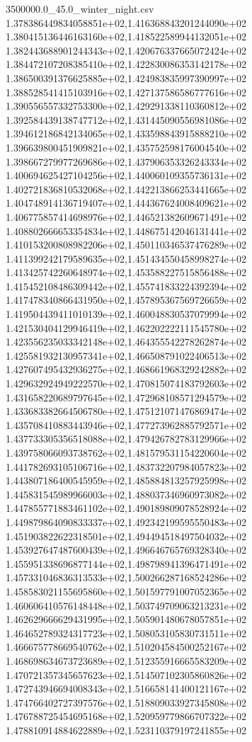 \begin{filecontents*}{3500000.0_45.0_winter_night.csv}
1.378386449834058851e+02,1.416368843201244090e+02
1.380415136446163160e+02,1.418522589944132051e+02
1.382443688901244343e+02,1.420676337665072424e+02
1.384472107208385410e+02,1.422830086353142178e+02
1.386500391376625885e+02,1.424983835997390997e+02
1.388528541415103916e+02,1.427137586586777616e+02
1.390556557332753300e+02,1.429291338110360812e+02
1.392584439138747712e+02,1.431445090556981086e+02
1.394612186842134065e+02,1.433598843915888210e+02
1.396639800451909821e+02,1.435752598176004540e+02
1.398667279977269686e+02,1.437906353326243334e+02
1.400694625427104256e+02,1.440060109355736131e+02
1.402721836810532068e+02,1.442213866253441665e+02
1.404748914136719407e+02,1.444367624008409621e+02
1.406775857414698976e+02,1.446521382609671491e+02
1.408802666653354834e+02,1.448675142046131441e+02
1.410153200808982206e+02,1.450110346537476289e+02
1.411399242179589635e+02,1.451434550458998274e+02
1.413425742260648974e+02,1.453588227515856488e+02
1.415452108486309442e+02,1.455741833224392394e+02
1.417478340866431950e+02,1.457895367569726659e+02
1.419504439411010139e+02,1.460048830537079994e+02
1.421530404129946419e+02,1.462202222111545780e+02
1.423556235033342148e+02,1.464355542278262874e+02
1.425581932130957341e+02,1.466508791022406513e+02
1.427607495432936275e+02,1.468661968329242882e+02
1.429632924949222570e+02,1.470815074183792603e+02
1.431658220689797645e+02,1.472968108571294579e+02
1.433683382664506780e+02,1.475121071476869474e+02
1.435708410883443946e+02,1.477273962885792571e+02
1.437733305356518088e+02,1.479426782783129966e+02
1.439758066093738762e+02,1.481579531154220604e+02
1.441782693105106716e+02,1.483732207984057823e+02
1.443807186400545959e+02,1.485884813257925998e+02
1.445831545989966003e+02,1.488037346960973082e+02
1.447855771883461102e+02,1.490189809078528924e+02
1.449879864090833337e+02,1.492342199595550483e+02
1.451903822622318501e+02,1.494494518497504032e+02
1.453927647487600439e+02,1.496646765769328340e+02
1.455951338696877144e+02,1.498798941396471491e+02
1.457331046836313533e+02,1.500266287168524286e+02
1.458583021155695860e+02,1.501597791007052365e+02
1.460606410576148448e+02,1.503749709063213231e+02
1.462629666629431995e+02,1.505901480678057851e+02
1.464652789324317723e+02,1.508053105830731511e+02
1.466675778669540762e+02,1.510204584500252167e+02
1.468698634673723689e+02,1.512355916665583209e+02
1.470721357345657623e+02,1.514507102305860826e+02
1.472743946694008343e+02,1.516658141400121167e+02
1.474766402727397576e+02,1.518809033927345808e+02
1.476788725454695168e+02,1.520959779866707322e+02
1.478810914884622889e+02,1.523110379197241855e+02

\end{filecontents*}
